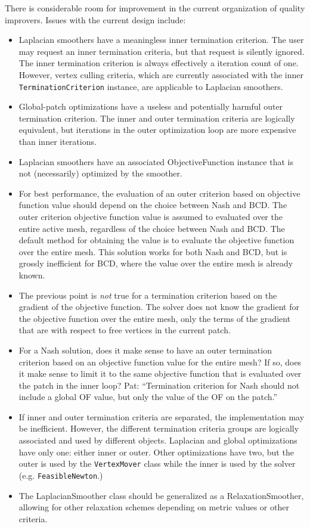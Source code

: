 \documentclass{article}
\begin{document}
There is considerable room for improvement in the current organization of quality improvers.  Issues with the current design include:
\begin{itemize}
\item Laplacian smoothers have a meaningless inner termination criterion.  The user may request an inner termination criteria, but that request is silently ignored.  The inner termination criterion is always effectively a iteration count of one.  However, vertex culling criteria, which are currently associated with the inner \texttt{TerminationCriterion} instance, are applicable to Laplacian smoothers.
\item Global-patch optimizations have a useless and potentially harmful outer termination criterion.  The inner and outer termination criteria are logically equivalent, but iterations in the outer optimization loop are more expensive than inner iterations.
\item Laplacian smoothers have an associated ObjectiveFunction instance that is not (necessarily) optimized by the smoother.
\item For best performance, the evaluation of an outer criterion based on objective function value should depend on the choice between Nash and BCD.  The outer criterion objective function value is assumed to evaluated over the entire active mesh, regardless of the choice between Nash and BCD.  The default method for obtaining the value is to evaluate the objective function over the entire mesh.  This solution works for both Nash and BCD, but is grossly inefficient for BCD, where the value over the entire mesh is already known.  
\item The previous point is \emph{not} true for a termination criterion based on the gradient of the objective function.  The solver does not know the gradient for the objective function over the entire mesh, only the terms of the gradient that are with respect to free vertices in the current patch.
\item For a Nash solution, does it make sense to have an outer termination criterion based on an objective function value for the entire mesh?  If so, does it make sense to limit it to the same objective function that is evaluated over the patch in the inner loop?  Pat: ``Termination criterion for Nash should not include a global OF value, but only the value of the OF on the patch.''
\item If inner and outer termination criteria are separated, the implementation may be inefficient.  However, the different termination criteria groups are logically associated and used by different objects.  Laplacian and global optimizations have only one: either inner or outer.  Other optimizations have two, but the outer is used by the \texttt{VertexMover} class while the inner is used by the solver (e.g. \texttt{FeasibleNewton}.)
\item The LaplacianSmoother class should be generalized as a RelaxationSmoother,
allowing for other relaxation schemes depending on metric values or other criteria.  
\end{itemize}
\end{document}
